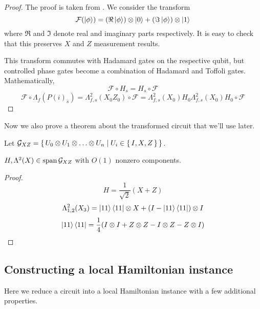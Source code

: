 \begin{proof}

The proof is taken from \cite{quant-ph/0301040}. We consider the transform
	$$\mathcal{F}(\ket{\phi})=(\Re\ket{\phi})\otimes\ket{0}+(\Im\ket{\phi})\otimes\ket{1}$$
where $\Re$ and $\Im$ denote real and imaginary parts respectively. It is easy to check that this preserves $X$ and $Z$ measurement results.

This transform commutes with Hadamard gates on the respective qubit, but controlled phase gates become a combination of Hadamard and Toffoli gates. Mathematically,
$$\mathcal{F}\circ H_s=H_s\circ\mathcal{F}$$
$$\mathcal{F}\circ\Lambda_f(P(i)_s)=\Lambda^2_{f,s}(X_0Z_0)\circ\mathcal{F}=\Lambda^2_{f,s}(X_0)H_0\Lambda^2_{f,s}(X_0)H_0\circ\mathcal{F}$$
\end{proof}

Now we also prove a theorem about the transformed circuit that we'll use later.

\begin{definition}
	Let $\mathcal{G}_{XZ}=\set{U_0\otimes U_1\otimes\ldots\otimes U_n|U_i\in\set{I,X,Z}}$.
\end{definition}

\begin{theorem}
	$H,\Lambda^2(X)\in\operatorname*{\operatorname{span}}\mathcal{G}_{XZ}$ with $O(1)$ nonzero components.
\end{theorem}

\begin{proof}
	$$H=\frac{1}{\sqrt{2}}(X+Z)$$
	$$\Lambda^2_{1,2}(X_3)=\ket{11}\bra{11}\otimes X+(I-\ket{11}\bra{11})\otimes I$$
	$$\ket{11}\bra{11}=\frac{1}{4}(I\otimes I+Z\otimes Z-I\otimes Z-Z\otimes I)$$
\end{proof}

\subsection{Constructing a local Hamiltonian instance}

Here we reduce a circuit into a local Hamiltonian instance with a few additional properties.

